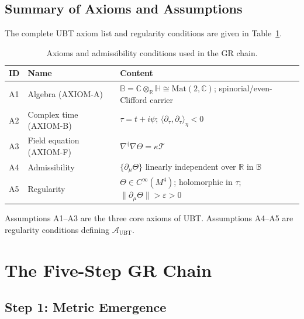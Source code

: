 \documentclass[12pt,a4paper]{article}
\theoremstyle{definition}
\theoremstyle{remark}
\newcommand{\BB}{\mathbb{B}}
\newcommand{\CC}{\mathbb{C}}
\newcommand{\RR}{\mathbb{R}}
\newcommand{\HH}{\mathbb{H}}
\newcommand{\calA}{\mathcal{A}}
\newcommand{\calT}{\mathcal{T}}
\begin{document}
\subsection{Summary of Axioms and Assumptions}

The complete UBT axiom list and regularity conditions are given in
Table~\ref{tab:axioms}.

\begin{table}[ht]
\centering
\caption{Axioms and admissibility conditions used in the GR chain.}
\label{tab:axioms}
\begin{tabular}{lll}
\toprule
\textbf{ID} & \textbf{Name} & \textbf{Content} \\
\midrule
A1 & Algebra (AXIOM-A) & $\BB = \CC\otimes_\RR\HH \cong \mathrm{Mat}(2,\CC)$; spinorial/even-Clifford carrier \\
A2 & Complex time (AXIOM-B) & $\tau = t+i\psi$; $\langle\partial_\tau,\partial_\tau\rangle_\eta < 0$ \\
A3 & Field equation (AXIOM-F) & $\nabla^\dagger\nabla\Theta = \kappa\calT$ \\
A4 & Admissibility & $\{\partial_\mu\Theta\}$ linearly independent over $\RR$ in $\BB$ \\
A5 & Regularity & $\Theta \in C^\infty(M^4)$; holomorphic in $\tau$;
                   $\|\partial_\mu\Theta\| > \varepsilon > 0$ \\
\bottomrule
\end{tabular}
\end{table}

Assumptions A1--A3 are the three core axioms of UBT.
Assumptions A4--A5 are regularity conditions defining $\calA_{\mathrm{UBT}}$.

\section{The Five-Step GR Chain}
\label{sec:chain}

\subsection{Step 1: Metric Emergence}
\label{sec:step1}
\end{document}
